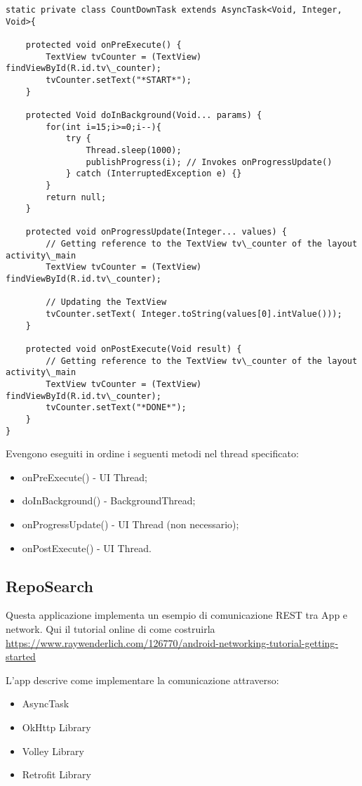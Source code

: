 \begin{lstlisting}
static private class CountDownTask extends AsyncTask<Void, Integer, Void>{

	protected void onPreExecute() {
		TextView tvCounter = (TextView) findViewById(R.id.tv\_counter);
		tvCounter.setText("*START*");
	}
	
	protected Void doInBackground(Void... params) {
		for(int i=15;i>=0;i--){
			try {
				Thread.sleep(1000);
				publishProgress(i); // Invokes onProgressUpdate()
			} catch (InterruptedException e) {}
		}
		return null;
	}
	
	protected void onProgressUpdate(Integer... values) {
		// Getting reference to the TextView tv\_counter of the layout activity\_main
		TextView tvCounter = (TextView) findViewById(R.id.tv\_counter);
		
		// Updating the TextView
		tvCounter.setText( Integer.toString(values[0].intValue()));
	}
	
	protected void onPostExecute(Void result) {
		// Getting reference to the TextView tv\_counter of the layout activity\_main
		TextView tvCounter = (TextView) findViewById(R.id.tv\_counter);
		tvCounter.setText("*DONE*");
	}
}
\end{lstlisting}

Evengono eseguiti in ordine i seguenti metodi nel thread specificato:
\begin{itemize}
	\item onPreExecute() - UI Thread;
	\item doInBackground() - BackgroundThread;
	\item onProgressUpdate() - UI Thread (non necessario);
	\item onPostExecute() - UI Thread.

\end{itemize}

	\subsection{RepoSearch}
	Questa applicazione implementa un esempio di comunicazione REST tra App
e network. Qui il tutorial online di come costruirla
\url{
https://www.raywenderlich.com/126770/android-networking-tutorial-getting-started
}

	L'app descrive come implementare la comunicazione attraverso:
	\begin{itemize}
		\item AsyncTask
		\item OkHttp Library
		\item Volley Library
		\item Retrofit Library
	\end{itemize}


